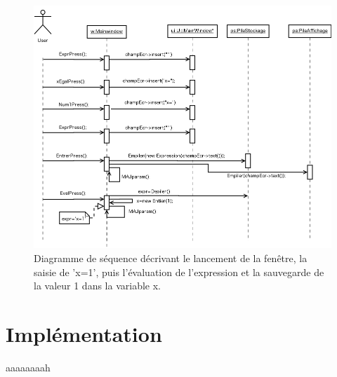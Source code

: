 \documentclass[a4paper,11pt]{article}
\begin{document}
\begin{figure}[H]
	\center
	\includegraphics[width=16.7cm]{diag_seq_2.png}
	\caption{Diagramme de séquence décrivant le lancement de la fenêtre, la saisie de 'x=1', puis l'évaluation de l'expression et la sauvegarde de la valeur 1 dans la variable x.}
\end{figure}

\section{Implémentation}
aaaaaaaah
\end{document}
